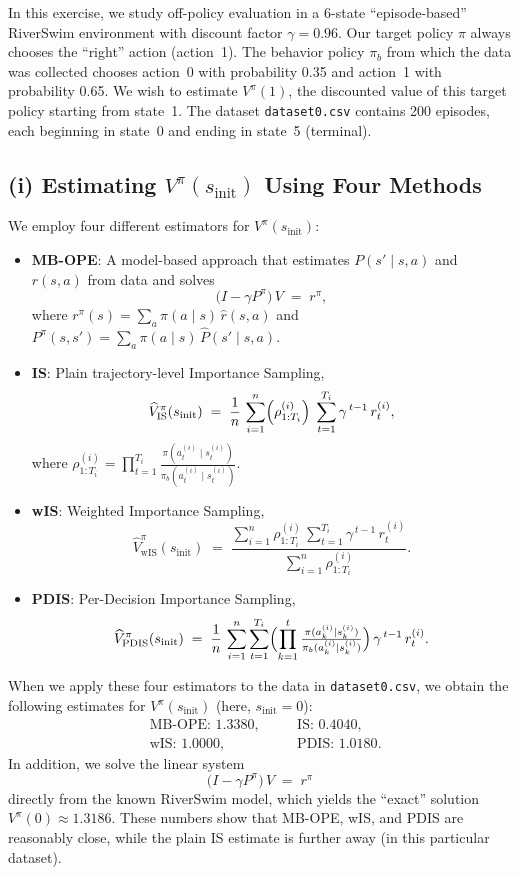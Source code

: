 In this exercise, we study off-policy evaluation in a 6-state ``episode-based'' RiverSwim environment with discount factor $\gamma = 0.96$. Our target policy $\pi$ always chooses the ``right'' action (action~1). The behavior policy $\pi_b$ from which the data was collected chooses action~0 with probability 0.35 and action~1 with probability 0.65. We wish to estimate $V^\pi(1)$, the discounted value of this target policy starting from state~1. The dataset \texttt{dataset0.csv} contains 200 episodes, each beginning in state~0 and ending in state~5 (terminal).

\subsection*{(i) Estimating $V^\pi(s_{\text{init}})$ Using Four Methods}
We employ four different estimators for $V^\pi(s_{\text{init}})$:
\begin{itemize}
    \item \textbf{MB-OPE}: A model-based approach that estimates $P(s' \mid s,a)$ and $r(s,a)$ from data and solves
    \[
        \bigl(I - \gamma P^\pi \bigr)\,V \;=\; r^\pi,
    \]
    where $r^\pi(s) = \sum_a \pi(a \mid s)\,\hat{r}(s,a)$ and $P^\pi(s,s') = \sum_a \pi(a \mid s)\,\hat{P}(s' \mid s,a)$.
    \item \textbf{IS}: Plain trajectory-level Importance Sampling,
    \[
        \widehat{V}^\pi_{\mathrm{IS}}(s_{\text{init}}) \;=\; \frac{1}{n}\,\sum_{i=1}^n \Bigl(\rho_{1:T_i}^{(i)}\Bigr)\;\sum_{t=1}^{T_i} \gamma^{\,t-1}\,r_t^{(i)},
    \]
    where $\rho_{1:T_i}^{(i)} = \prod_{t=1}^{T_i} \frac{\pi(a_t^{(i)} \mid s_t^{(i)})}{\pi_b(a_t^{(i)} \mid s_t^{(i)})}$.
    \item \textbf{wIS}: Weighted Importance Sampling,
    \[
        \widehat{V}^\pi_{\mathrm{wIS}}(s_{\text{init}}) \;=\; \frac{\sum_{i=1}^n \rho_{1:T_i}^{(i)} \,\sum_{t=1}^{T_i} \gamma^{\,t-1}\,r_t^{(i)}}{\sum_{i=1}^n \rho_{1:T_i}^{(i)}}.
    \]
    \item \textbf{PDIS}: Per-Decision Importance Sampling,
    \[
        \widehat{V}^\pi_{\mathrm{PDIS}}(s_{\text{init}}) \;=\; \frac{1}{n}\,\sum_{i=1}^n \sum_{t=1}^{T_i} \Bigl(\prod_{k=1}^t \tfrac{\pi(a_k^{(i)} \mid s_k^{(i)})}{\pi_b(a_k^{(i)} \mid s_k^{(i)})}\Bigr)\,\gamma^{\,t-1}\,r_t^{(i)}.
    \]
\end{itemize}

When we apply these four estimators to the data in \texttt{dataset0.csv}, we obtain the following estimates for $V^\pi(s_{\text{init}})$ (here, $s_{\text{init}}=0$):
\[
\begin{aligned}
&\text{MB-OPE: } 1.3380, \quad 
&&\text{IS: } 0.4040,\\
&\text{wIS: } 1.0000, \quad
&&\text{PDIS: } 1.0180.
\end{aligned}
\]
In addition, we solve the linear system
\[
    \bigl(I - \gamma P^\pi\bigr)\,V \;=\; r^\pi
\]
directly from the known RiverSwim model, which yields the ``exact'' solution $V^\pi(0) \approx 1.3186$. These numbers show that MB-OPE, wIS, and PDIS are reasonably close, while the plain IS estimate is further away (in this particular dataset).

